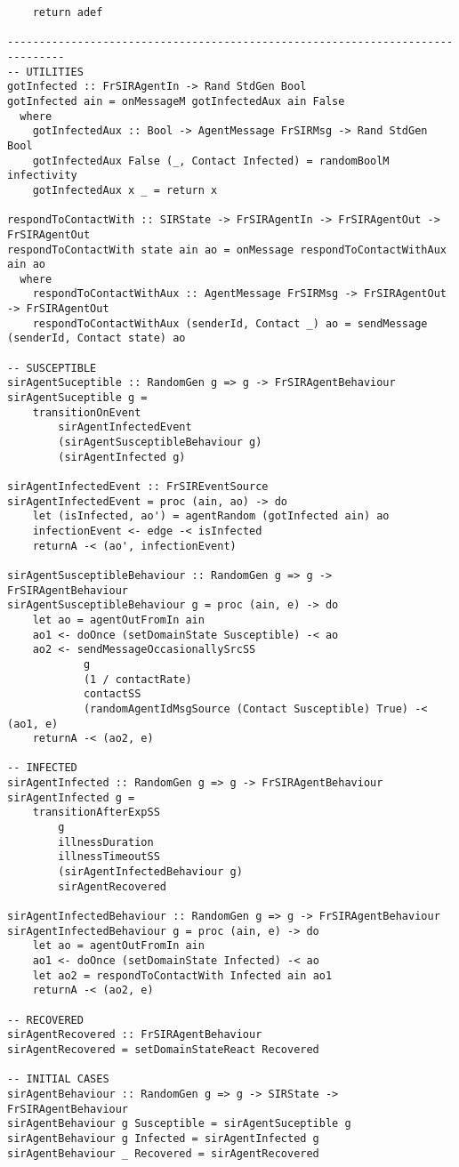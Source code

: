\begin{verbatim}
    return adef
   
-------------------------------------------------------------------------------
-- UTILITIES
gotInfected :: FrSIRAgentIn -> Rand StdGen Bool
gotInfected ain = onMessageM gotInfectedAux ain False
  where
    gotInfectedAux :: Bool -> AgentMessage FrSIRMsg -> Rand StdGen Bool
    gotInfectedAux False (_, Contact Infected) = randomBoolM infectivity
    gotInfectedAux x _ = return x

respondToContactWith :: SIRState -> FrSIRAgentIn -> FrSIRAgentOut -> FrSIRAgentOut
respondToContactWith state ain ao = onMessage respondToContactWithAux ain ao
  where
    respondToContactWithAux :: AgentMessage FrSIRMsg -> FrSIRAgentOut -> FrSIRAgentOut
    respondToContactWithAux (senderId, Contact _) ao = sendMessage (senderId, Contact state) ao

-- SUSCEPTIBLE
sirAgentSuceptible :: RandomGen g => g -> FrSIRAgentBehaviour
sirAgentSuceptible g = 
	transitionOnEvent 
		sirAgentInfectedEvent 
		(sirAgentSusceptibleBehaviour g) 
		(sirAgentInfected g)

sirAgentInfectedEvent :: FrSIREventSource
sirAgentInfectedEvent = proc (ain, ao) -> do
    let (isInfected, ao') = agentRandom (gotInfected ain) ao
    infectionEvent <- edge -< isInfected
    returnA -< (ao', infectionEvent)

sirAgentSusceptibleBehaviour :: RandomGen g => g -> FrSIRAgentBehaviour
sirAgentSusceptibleBehaviour g = proc (ain, e) -> do
    let ao = agentOutFromIn ain
    ao1 <- doOnce (setDomainState Susceptible) -< ao
    ao2 <- sendMessageOccasionallySrcSS 
    		g
    		(1 / contactRate)
    		contactSS
    		(randomAgentIdMsgSource (Contact Susceptible) True) -< (ao1, e)
    returnA -< (ao2, e)

-- INFECTED
sirAgentInfected :: RandomGen g => g -> FrSIRAgentBehaviour
sirAgentInfected g = 
	transitionAfterExpSS 
		g 
		illnessDuration 
		illnessTimeoutSS 
		(sirAgentInfectedBehaviour g) 
		sirAgentRecovered

sirAgentInfectedBehaviour :: RandomGen g => g -> FrSIRAgentBehaviour
sirAgentInfectedBehaviour g = proc (ain, e) -> do
    let ao = agentOutFromIn ain
    ao1 <- doOnce (setDomainState Infected) -< ao
    let ao2 = respondToContactWith Infected ain ao1
    returnA -< (ao2, e)

-- RECOVERED
sirAgentRecovered :: FrSIRAgentBehaviour
sirAgentRecovered = setDomainStateReact Recovered

-- INITIAL CASES
sirAgentBehaviour :: RandomGen g => g -> SIRState -> FrSIRAgentBehaviour
sirAgentBehaviour g Susceptible = sirAgentSuceptible g
sirAgentBehaviour g Infected = sirAgentInfected g
sirAgentBehaviour _ Recovered = sirAgentRecovered


\end{verbatim}
